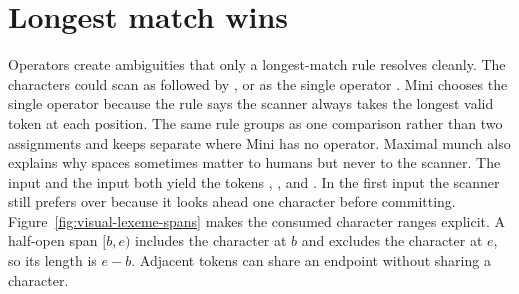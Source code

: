 \section{Longest match wins}
\label{sec:ch03-longest-match}

Operators create ambiguities that only a longest-match rule resolves cleanly.
The characters \code{<=} could scan as \code{<} followed by \code{=}, or as the single operator \code{<=}.
Mini chooses the single operator because the  rule says the scanner always takes the longest valid token at each position.
The same rule groups \code{==} as one comparison rather than two assignments and keeps \code{!} separate where Mini has no \code{!=} operator.
Maximal munch also explains why spaces sometimes matter to humans but never to the scanner.
The input  and the input  both yield the tokens , \code{<=}, and .
In the first input the scanner still prefers \code{<=} over \code{<} because it looks ahead one character before committing.
Figure~\ref{fig:visual-lexeme-spans} makes the consumed character ranges explicit.
A half-open span $[b,e)$ includes the character at $b$ and excludes the character at $e$, so its length is $e-b$.
Adjacent tokens can share an endpoint without sharing a character.




